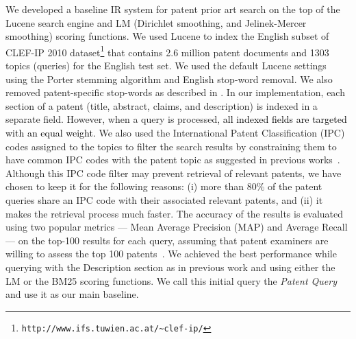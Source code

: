 We developed a baseline IR system for patent prior art search on the top of
the Lucene search engine
and LM (Dirichlet
smoothing, and Jelinek-Mercer smoothing)
scoring functions. %
We used Lucene to index the English subset of CLEF-IP 2010 dataset\footnote{\texttt{http://www.ifs.tuwien.ac.at/\textasciitilde{}clef-ip/}} 
that contains 2.6 million patent documents and 1303 topics (queries) for the English test set.
We used the default Lucene settings using the Porter stemming algorithm 
and English stop-word removal. 
We also removed patent-specific stop-words as described in \cite{magdy2012toward}.
In
our implementation, each section of a patent (title, abstract, claims,
and description) is indexed in a separate field. However, when a query 
is processed, \textcolor{black}{all indexed fields are targeted with an equal weight.}
We also used the International
Patent Classification (IPC) codes assigned to the topics to filter
the search results by constraining them to have common IPC codes with
the patent topic as suggested in previous works~\cite{lopez2010experiments}.
Although this IPC code filter may prevent retrieval of relevant patents, we
have chosen to keep it for the following reasons: (i) more than 80\%
of the patent queries share an IPC code with their associated relevant
patents, and (ii) it makes the retrieval process much faster. The accuracy of the results is evaluated using two popular metrics --- Mean Average Precision (MAP) and Average Recall --- on the top-100 results for each query, assuming that patent examiners are willing to assess the top 100 patents~\cite{joho2010survey}. 
We achieved the best performance while querying with the Description
section as in previous work \cite{xue2009transforming} and using
either the LM or the BM25 scoring functions. We call this initial
query the \textit{Patent Query} and use it as our main baseline.

